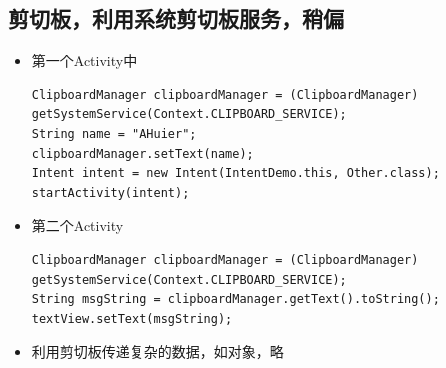 \documentclass[9pt, b5paaper]{book}
\begin{document}
\subsection{剪切板，利用系统剪切板服务，稍偏}
\label{sec-1-6-7}
\begin{itemize}
\item 第一个Activity中
\begin{verbatim}
ClipboardManager clipboardManager = (ClipboardManager) getSystemService(Context.CLIPBOARD_SERVICE);
String name = "AHuier";
clipboardManager.setText(name);
Intent intent = new Intent(IntentDemo.this, Other.class);
startActivity(intent);
\end{verbatim}
\item 第二个Activity
\begin{verbatim}
ClipboardManager clipboardManager = (ClipboardManager) getSystemService(Context.CLIPBOARD_SERVICE);
String msgString = clipboardManager.getText().toString();
textView.setText(msgString);
\end{verbatim}
\item 利用剪切板传递复杂的数据，如对象，略
\end{itemize}
\end{document}
